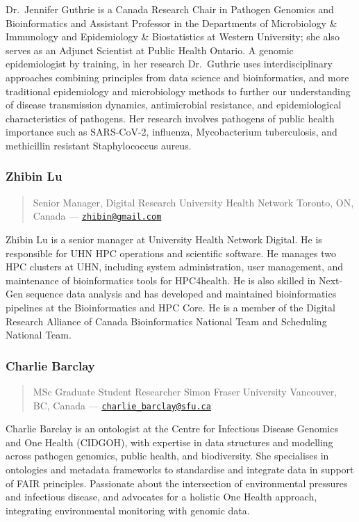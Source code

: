 \documentclass[
]{book}
\begin{document}
Dr.~Jennifer Guthrie is a Canada Research Chair in Pathogen Genomics and Bioinformatics and Assistant Professor in the Departments of Microbiology \& Immunology and Epidemiology \& Biostatistics at Western University; she also serves as an Adjunct Scientist at Public Health Ontario. A genomic epidemiologist by training, in her research Dr.~Guthrie uses interdisciplinary approaches combining principles from data science and bioinformatics, and more traditional epidemiology and microbiology methods to further our understanding of disease transmission dynamics, antimicrobial resistance, and epidemiological characteristics of pathogens. Her research involves pathogens of public health importance such as SARS-CoV-2, influenza, Mycobacterium tuberculosis, and methicillin resistant Staphylococcus aureus.

\subsubsection{Zhibin Lu}\label{zhibin-lu}

\begin{quote}
Senior Manager, Digital Research University Health Network
Toronto, ON, Canada ---
\href{mailto:zhibin@gmail.com}{\nolinkurl{zhibin@gmail.com}}
\end{quote}

Zhibin Lu is a senior manager at University Health Network Digital. He is responsible for UHN HPC operations and scientific software. He manages two HPC clusters at UHN, including system administration, user management, and maintenance of bioinformatics tools for HPC4health. He is also skilled in Next-Gen sequence data analysis and has developed and maintained bioinformatics pipelines at the Bioinformatics and HPC Core. He is a member of the Digital Research Alliance of Canada Bioinformatics National Team and Scheduling National Team.

\subsubsection{Charlie Barclay}\label{charlie-barclay}

\begin{quote}
MSc Graduate Student Researcher
Simon Fraser University Vancouver, BC, Canada ---
\href{mailto:charlie_barclay@sfu.ca}{\nolinkurl{charlie\_barclay@sfu.ca}}
\end{quote}

Charlie Barclay is an ontologist at the Centre for Infectious Disease Genomics and One Health (CIDGOH), with expertise in data structures and modelling across pathogen genomics, public health, and biodiversity. She specialises in ontologies and metadata frameworks to standardise and integrate data in support of FAIR principles. Passionate about the intersection of environmental pressures and infectious disease, and advocates for a holistic One Health approach, integrating environmental monitoring with genomic data.
\end{document}
